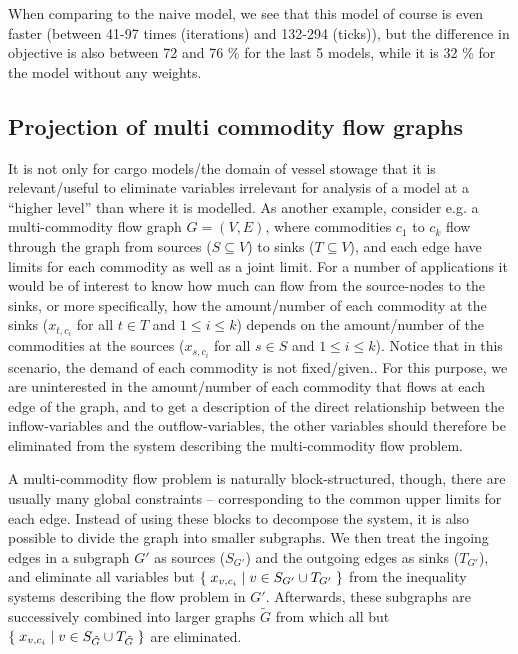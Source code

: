 

When comparing to the naive model, we see that this model of course is even faster (between 41-97 times (iterations) and 132-294 (ticks)), but the difference in objective is also between 72 and 76 \% for the last 5 models, while it is 32 \% for the model without any weights. 



\subsection{Projection of multi commodity flow graphs}
It is not only for cargo models/the domain of vessel stowage that it is relevant/useful to eliminate variables irrelevant for analysis of a model at a ``higher level'' than where it is modelled. 
As another example, consider e.g. a multi-commodity flow graph $G=(V,E)$, where commodities $c_1$ to $c_k$ flow through the graph from sources ($S\subseteq V$) to sinks ($T\subseteq V$), and each edge have limits for each commodity as well as a joint limit. 
For a number of applications it would be of interest to know how much can flow from the source-nodes to the sinks, or more specifically, how the amount/number of each commodity at the sinks ($x_{t, c_i}$ for all $t\in T$ and $1\leq i\leq k$) depends on the amount/number of the commodities at the sources ($x_{s, c_i}$ for all $s\in S$ and $1\leq i\leq k$). {Notice that in this scenario, the demand of each commodity is not fixed/given.}. For this purpose, we are uninterested in the amount/number of each commodity that flows at each edge of the graph, and to get a description of the direct relationship between the inflow-variables and the outflow-variables, the other variables should therefore be eliminated from the system describing the multi-commodity flow problem. 
		
A multi-commodity flow problem is naturally block-structured, though, there are usually many global constraints -- corresponding to the common upper limits for each edge. Instead of using these blocks to decompose the system, it is also possible to divide the graph into smaller subgraphs. We then treat the ingoing edges in a subgraph $G'$ as sources ($S_{G'}$) and the outgoing edges as sinks ($T_{G'}$), and eliminate all variables but $\{\;{x_{v,c_i}}\;|\;{v\in S_{G'}\cup T_{G'}}\;\}$ from the inequality systems describing the flow problem in $G'$. Afterwards, these  subgraphs are successively combined into larger graphs $\tilde{G}$ from which all but $\{\;{x_{v,c_i}}\;|\;{v\in S_{\tilde G}\cup T_{\tilde G}}\;\}$ are eliminated. 

